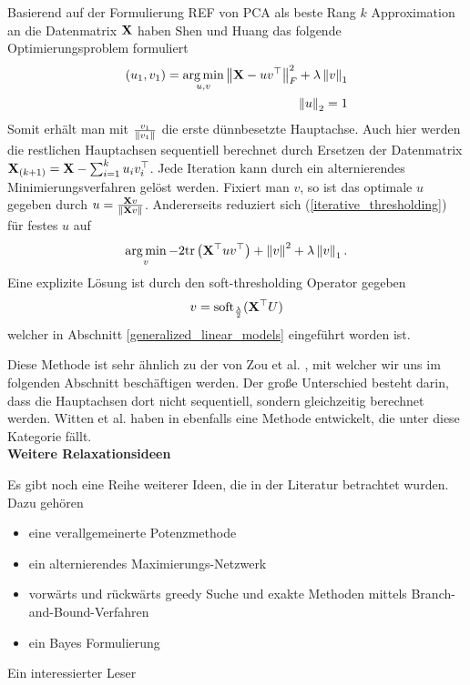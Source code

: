 Basierend auf der Formulierung REF von PCA als beste Rang $k$ Approximation an die Datenmatrix $\mathbf{X}$ haben Shen und Huang \cite{shen} das folgende Optimierungsproblem formuliert
\begin{align}
\label{iterative_thresholding}
\begin{split}
(u_1, v_1) = \operatorname*{arg\,min}_{u, v} \left\lVert \mathbf{X} - u v^{\top} \right\rVert_{F}^{2}  + \lambda \left\lVert v \right\rVert_{1}\\
\left\lVert u \right\rVert_2 = 1
\end{split}
\end{align}
Somit erhält man mit $\frac{v_1}{\left\lVert v_1 \right\rVert}$ die erste dünnbesetzte Hauptachse. Auch hier werden die restlichen Hauptachsen sequentiell berechnet durch Ersetzen der Datenmatrix $\mathbf{X}_{(k+1)} = \mathbf{X} - \sum_{i=1}^k u_iv_i^{\top}$. Jede Iteration kann durch ein alternierendes Minimierungsverfahren gelöst werden. Fixiert man $v$, so ist das optimale $u$ gegeben durch $u = \frac{\mathbf{X}v}{\left\lVert \mathbf{X}v \right\rVert}$. Andererseits reduziert sich (\ref{iterative_thresholding}) für festes $u$ auf
$$\operatorname*{arg\,min}_{v} -2\text{tr} \left( \mathbf{X}^{\top}uv^{\top} \right) + \left\lVert v \right\rVert^{2} + \lambda \left\lVert v \right\rVert_1.$$
Eine explizite Lösung ist durch den soft-thresholding Operator gegeben
$$v = \operatorname{soft}_{\frac{\lambda}{2}}(\mathbf{X}^{\top} U)$$
welcher in Abschnitt \ref{generalized_linear_models} eingeführt worden ist.

Diese Methode ist sehr ähnlich zu der von Zou et al. \cite{zou_sparsepca} , mit welcher wir uns im folgenden Abschnitt beschäftigen werden. Der große Unterschied besteht darin, dass die Hauptachsen dort nicht sequentiell, sondern gleichzeitig berechnet werden. Witten et al. haben in \cite{witten} ebenfalls eine Methode entwickelt, die unter diese Kategorie fällt.\\

\textbf{Weitere Relaxationsideen}

Es gibt noch eine Reihe weiterer Ideen, die in der Literatur betrachtet wurden. Dazu gehören
\begin{itemize}
\item eine verallgemeinerte Potenzmethode \cite{journee}
\item ein alternierendes Maximierungs-Netzwerk \cite{richtarik}
\item vorwärts und rückwärts greedy Suche und exakte Methoden mittels Branch-and-Bound-Verfahren \cite{moghaddam}
\item ein Bayes Formulierung \cite{guan}
\end{itemize}

Ein interessierter Leser 




